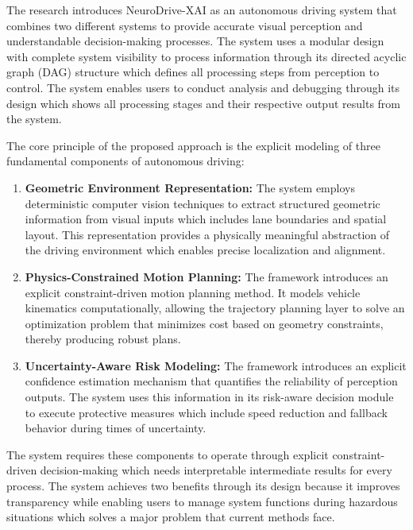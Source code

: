 \documentclass[conference]{IEEEtran}
\begin{document}
The research introduces NeuroDrive-XAI as an autonomous driving system that combines two different systems to provide accurate visual perception and understandable decision-making processes. The system uses a modular design with complete system visibility to process information through its directed acyclic graph (DAG) structure which defines all processing steps from perception to control. The system enables users to conduct analysis and debugging through its design which shows all processing stages and their respective output results from the system.

The core principle of the proposed approach is the explicit modeling of three fundamental components of autonomous driving:

\begin{enumerate}
    \item \textbf{Geometric Environment Representation:}
The system employs deterministic computer vision techniques to extract structured geometric information from visual inputs which includes lane boundaries and spatial layout. This representation provides a physically meaningful abstraction of the driving environment which enables precise localization and alignment.

    \item \textbf{Physics-Constrained Motion Planning:}
The framework introduces an explicit constraint-driven motion planning method. It models vehicle kinematics computationally, allowing the trajectory planning layer to solve an optimization problem that minimizes cost based on geometry constraints, thereby producing robust plans.

    \item \textbf{Uncertainty-Aware Risk Modeling:}
The framework introduces an explicit confidence estimation mechanism that quantifies the reliability of perception outputs. The system uses this information in its risk-aware decision module to execute protective measures which include speed reduction and fallback behavior during times of uncertainty.
\end{enumerate}

The system requires these components to operate through explicit constraint-driven decision-making which needs interpretable intermediate results for every process. The system achieves two benefits through its design because it improves transparency while enabling users to manage system functions during hazardous situations which solves a major problem that current methods face.
\end{document}
